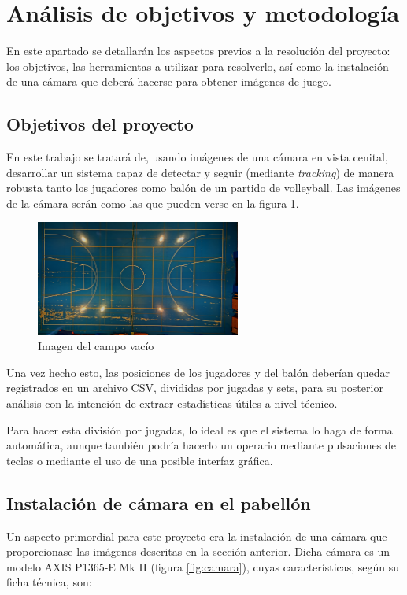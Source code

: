 \section{Análisis de objetivos y metodología}
En este apartado se detallarán los aspectos previos a la resolución del proyecto: los objetivos, las herramientas a utilizar para resolverlo, así como la instalación de una cámara que deberá hacerse para obtener imágenes de juego.

\subsection{Objetivos del proyecto}
En este trabajo se tratará de, usando imágenes de una cámara en vista cenital, desarrollar un sistema capaz de detectar y seguir (mediante \textit{tracking}) de manera robusta tanto los jugadores como balón de un partido de volleyball. Las imágenes de la cámara serán como las que pueden verse en la figura \ref{fig:campo}.

\begin{figure}
    \centering
    \includegraphics[width=0.6\textwidth]{images/campo}
    \caption{Imagen del campo vacío}
    \label{fig:campo}
\end{figure}

Una vez hecho esto, las posiciones de los jugadores y del balón deberían quedar registrados en un archivo CSV, divididas por jugadas y sets, para su posterior análisis con la intención de extraer estadísticas útiles a nivel técnico. 

Para hacer esta división por jugadas, lo ideal es que el sistema lo haga de forma automática, aunque también podría hacerlo un operario mediante pulsaciones de teclas o mediante el uso de una posible interfaz gráfica.

\subsection{Instalación de cámara en el pabellón}
Un aspecto primordial para este proyecto era la instalación de una cámara que proporcionase las imágenes descritas en la sección anterior. Dicha cámara es un modelo AXIS P1365-E Mk II (figura \ref{fig:camara}), cuyas características, según su ficha técnica, son:

